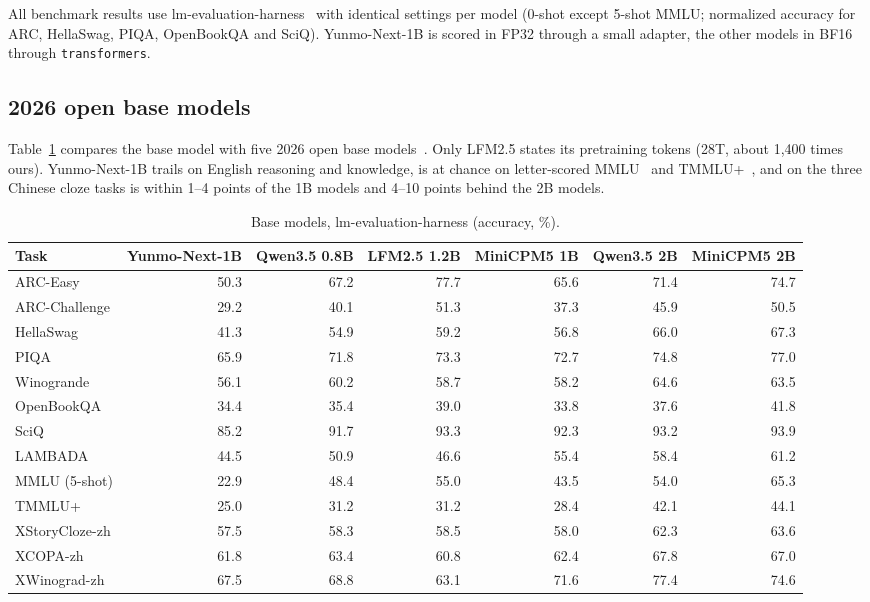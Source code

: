 \documentclass[11pt]{article}
\newcommand{\yn}{Yunmo-Next-1B}
\begin{document}
All benchmark results use lm-evaluation-harness~\cite{lmeval2024} with identical settings per model (0-shot
except 5-shot MMLU; normalized accuracy for ARC, HellaSwag, PIQA, OpenBookQA and SciQ). \yn{} is scored in
FP32 through a small adapter, the other models in BF16 through \texttt{transformers}.

\subsection{2026 open base models}

Table~\ref{tab:peers} compares the base model with five 2026 open base models~\cite{qwen35,lfm25,minicpm5}. Only
LFM2.5 states its pretraining tokens (28T, about 1,400 times ours). \yn{} trails on English reasoning and
knowledge, is at chance on letter-scored MMLU~\cite{mmlu2020} and TMMLU+~\cite{tmmluplus2024}, and on the three
Chinese cloze tasks is within 1--4 points of the 1B models and 4--10 points behind the 2B models.

\begin{table}[t]
\centering\footnotesize\setlength{\tabcolsep}{4pt}
\caption{Base models, lm-evaluation-harness (accuracy, \%).}\label{tab:peers}
\begin{tabular}{@{}lrrrrrr@{}}
\toprule
Task & \yn{} & Qwen3.5 0.8B & LFM2.5 1.2B & MiniCPM5 1B & Qwen3.5 2B & MiniCPM5 2B \\
\midrule
ARC-Easy & 50.3 & 67.2 & 77.7 & 65.6 & 71.4 & 74.7 \\
ARC-Challenge & 29.2 & 40.1 & 51.3 & 37.3 & 45.9 & 50.5 \\
HellaSwag & 41.3 & 54.9 & 59.2 & 56.8 & 66.0 & 67.3 \\
PIQA & 65.9 & 71.8 & 73.3 & 72.7 & 74.8 & 77.0 \\
Winogrande & 56.1 & 60.2 & 58.7 & 58.2 & 64.6 & 63.5 \\
OpenBookQA & 34.4 & 35.4 & 39.0 & 33.8 & 37.6 & 41.8 \\
SciQ & 85.2 & 91.7 & 93.3 & 92.3 & 93.2 & 93.9 \\
LAMBADA & 44.5 & 50.9 & 46.6 & 55.4 & 58.4 & 61.2 \\
MMLU (5-shot) & 22.9 & 48.4 & 55.0 & 43.5 & 54.0 & 65.3 \\
TMMLU+ & 25.0 & 31.2 & 31.2 & 28.4 & 42.1 & 44.1 \\
XStoryCloze-zh & 57.5 & 58.3 & 58.5 & 58.0 & 62.3 & 63.6 \\
XCOPA-zh & 61.8 & 63.4 & 60.8 & 62.4 & 67.8 & 67.0 \\
XWinograd-zh & 67.5 & 68.8 & 63.1 & 71.6 & 77.4 & 74.6 \\
\bottomrule
\end{tabular}
\end{table}
\end{document}
